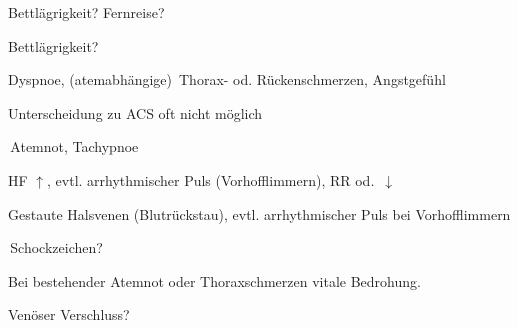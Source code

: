 {
\begin{ABCDESlide}
  \item[\ABCDE{1}] Bettlägrigkeit? Fernreise?
  \item[\ABCDE{2}] Bettlägrigkeit?
  \item[\ABCDE{4}] Dyspnoe, (atemabhängige)
  {\RedFlag}\,Thorax- od. Rückenschmerzen, Angstgefühl
  
  Unterscheidung zu ACS oft nicht möglich
  \item[\ABCDE{B}] {\RedFlag}\,Atemnot, Tachypnoe
  \item[\ABCDE{C}] HF $\uparrow$, evtl. arrhythmischer Puls
  (Vorhofflimmern), RR \SymbolFindingNormal od.
  {\RedFlag}\,$\downarrow$

  Gestaute Halsvenen (Blutrückstau), evtl. arrhythmischer Puls bei Vorhofflimmern
  
  {\RedFlag}\,Schockzeichen?
% 
  \item[\ABCDE{=}] Bei bestehender Atemnot oder
  Thoraxschmerzen vitale Bedrohung.
  \item[\ABCDE{\ldots}] Venöser Verschluss?
\end{ABCDESlide}
}
{}
{}
{}

